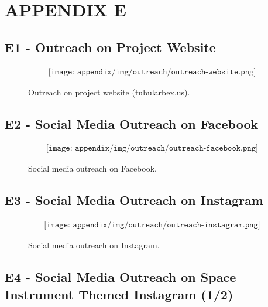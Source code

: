 \section{APPENDIX E} \label{sec:appE}

\subsection*{E1 - Outreach on Project Website}

\begin{figure}[H]
    \begin{align*}
        \texttt{[image: appendix/img/outreach/outreach-website.png]}
    \end{align*}
    \caption{Outreach on project website (tubularbex.us).}
    \label{fig:outreach-website}
\end{figure}

\subsection*{E2 - Social Media Outreach on Facebook}

\begin{figure}[H]
    \begin{align*}
        \texttt{[image: appendix/img/outreach/outreach-facebook.png]}
    \end{align*}
    \caption{Social media outreach on Facebook.}
    \label{fig:outreach-facebook}
\end{figure}

\subsection*{E3 - Social Media Outreach on Instagram}

\begin{figure}[H]
    \begin{align*}
        \texttt{[image: appendix/img/outreach/outreach-instagram.png]}
    \end{align*}
    \caption{Social media outreach on Instagram.}
    \label{fig:outreach-instagram}
\end{figure}

\subsection*{E4 - Social Media Outreach on Space Instrument Themed Instagram (1/2)}

